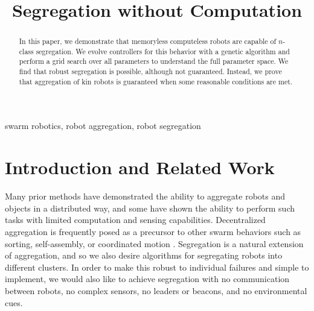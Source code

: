 \documentclass[conference]{IEEEtran}
\begin{document}
\title{Segregation without Computation}

\author{
\and
{}
\and
{}
}

\maketitle

\begin{abstract}
  In this paper, we demonstrate that memoryless computeless robots are capable of $n$-class segregation. We evolve controllers for this behavior with a genetic algorithm and perform a grid search over all parameters to understand the full parameter space. We find that robust segregation is possible, although not guaranteed. Instead, we prove that aggregation of kin robots is guaranteed when some reasonable conditions are met.
\end{abstract}

\begin{IEEEkeywords}
  swarm robotics, robot aggregation, robot segregation
\end{IEEEkeywords}

\section{Introduction and Related Work}

  Many prior methods have demonstrated the ability to aggregate robots and objects in a distributed way, and some have shown the ability to perform such tasks with limited computation and sensing capabilities. Decentralized aggregation is frequently posed as a precursor to other swarm behaviors such as sorting, self-assembly, or coordinated motion \cite{gauci_evolving_2014} \cite{dorigo_evolving_2004}. Segregation is a natural extension of aggregation, and so we also desire algorithms for segregating robots into different clusters. In order to make this robust to individual failures and simple to implement, we would also like to achieve segregation with no communication between robots, no complex sensors, no leaders or beacons, and no environmental cues.
\end{document}
